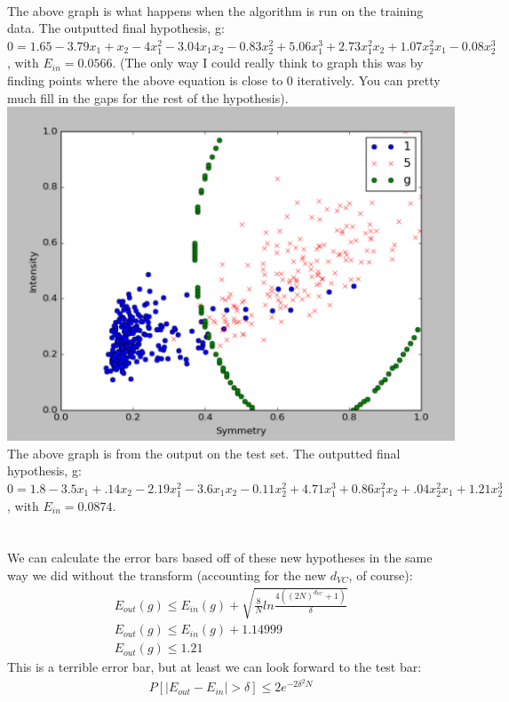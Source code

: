 \documentclass[12pt]{article}
\begin{document}
\begin{enumerate}[label=(\alph*)]
 	\\ The above graph is what happens when the algorithm is run on the training data. The outputted final hypothesis, g: $0 = 1.65 - 3.79x_1 + x_2 - 4x_1^2 - 3.04x_1x_2 - 0.83x_2^2 + 5.06x_1^3 + 2.73x_1^2x_2 + 1.07x_2^2x_1 - 0.08x_2^3$, with $E_{in} = \boldsymbol{0.0566}$. (The only way I could really think to graph this was by finding points where the above equation is close to 0 iteratively. You can pretty much fill in the gaps for the rest of the hypothesis).
 	\\ \includegraphics[scale=.5]{1-4a.png}
 	\\ The above graph is from the output on the test set. The outputted final hypothesis, g: $0 = 1.8 - 3.5x_1 + .14x_2 - 2.19x_1^2 - 3.6x_1x_2 - 0.11x_2^2 + 4.71x_1^3 + 0.86x_1^2x_2 + .04x_2^2x_1 + 1.21x_2^3$, with $E_{in} = \boldsymbol{0.0874}$.
 	\\ 
 	\\ \\ We can calculate the error bars based off of these new hypotheses in the same way we did without the transform (accounting for the new $d_{VC}$, of course):
 	\begin{gather*}
 			E_{out}(g) \le E_{in}(g) + \sqrt{\frac{8}{N} ln \frac{4((2N)^{d_{VC}} + 1)}{\delta}}
 			\\ E_{out}(g) \le E_{in}(g) + 1.14999
 			\\ E_{out}(g) \le \boldsymbol{1.21}
 	\end{gather*}
 	This is a terrible error bar, but at least we can look forward to the test bar:
 	\begin{gather*}
	 	P[|E_{out} - E_{in}| > \delta] \le 2e^{-2\delta^2N}

\end{gather*}
\end{enumerate}
\end{document}
